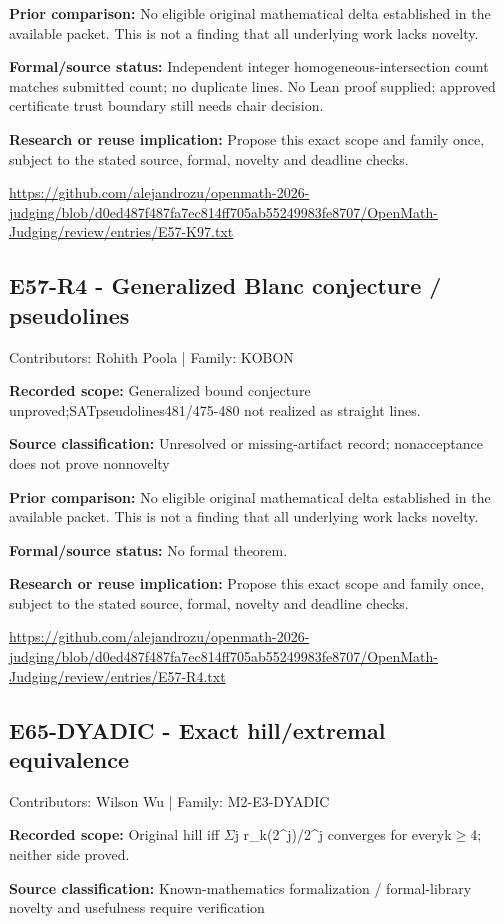 \documentclass[11pt,a4paper]{article}
\begin{document}
\textbf{Prior comparison:} No eligible original mathematical delta established in the available packet. This is not a finding that all underlying work lacks novelty.

\textbf{Formal/source status:} Independent integer homogeneous-intersection count matches submitted count; no duplicate lines. No Lean proof supplied; approved certificate trust boundary still needs chair decision.

\textbf{Research or reuse implication:} Propose this exact scope and family once, subject to the stated source, formal, novelty and deadline checks.

{\small \url{https://github.com/alejandrozu/openmath-2026-judging/blob/d0ed487f487fa7ec814ff705ab55249983fe8707/OpenMath-Judging/review/entries/E57-K97.txt}\par}

\begin{samepage}
\subsection{E57-R4  -  Generalized Blanc conjecture / pseudolines}
{\small Contributors: Rohith Poola | Family: KOBON\par}

\textbf{Recorded scope:} Generalized bound conjecture unproved;SATpseudolines481/475-480 not realized as straight lines.

\end{samepage}
\textbf{Source classification:} Unresolved or missing-artifact record; nonacceptance does not prove nonnovelty

\textbf{Prior comparison:} No eligible original mathematical delta established in the available packet. This is not a finding that all underlying work lacks novelty.

\textbf{Formal/source status:} No formal theorem.

\textbf{Research or reuse implication:} Propose this exact scope and family once, subject to the stated source, formal, novelty and deadline checks.

{\small \url{https://github.com/alejandrozu/openmath-2026-judging/blob/d0ed487f487fa7ec814ff705ab55249983fe8707/OpenMath-Judging/review/entries/E57-R4.txt}\par}

\begin{samepage}
\subsection{E65-DYADIC  -  Exact hill/extremal equivalence}
{\small Contributors: Wilson Wu | Family: M2-E3-DYADIC\par}

\textbf{Recorded scope:} Original hill iff \ensuremath{\Sigma}j r\_k(2\textasciicircum{}j)/2\textasciicircum{}j converges for everyk\ensuremath{\geq}4; neither side proved.

\end{samepage}
\textbf{Source classification:} Known-mathematics formalization / formal-library novelty and usefulness require verification
\end{document}
